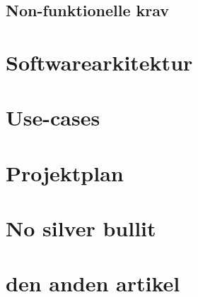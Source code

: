 \documentclass[12pt]{article}
\begin{document}
\subsection{Non-funktionelle krav}
\section{Softwarearkitektur}

\section{Use-cases}
\section{Projektplan}

\section{No silver bullit}
\section{ den anden artikel}
\end{document}
